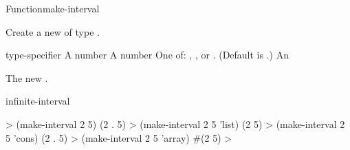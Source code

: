 \documentclass[10pt,twoside,english,pdftex]{article}
\begin{document}
\begin{functiondoc}{Function}{make-interval}%
  { 
      
    \returns{} }
%
%

\fnsyntax

\fnpurpose Create a new  of type .

\fnpackage {}

\fnmodule {}

\fnargs
\begin{args}{type-specifier}
\arg[start] A number
\arg[end] A number
 One of: , , or .
  (Default is .)
 An 
\end{args}

\fnreturns The new .

\begin{alsos}{infinite-interval}
\end{alsos}

\fnexamples
%
\W\supp
\begin{example}
  > (make-interval 2 5)
  (2 . 5)
  > (make-interval 2 5 'list)
  (2 5)
  > (make-interval 2 5 'cons)
  (2 . 5)
  > (make-interval 2 5 'array)
  #(2 5)
  >
\end{example}

\end{functiondoc}

\end{document}

